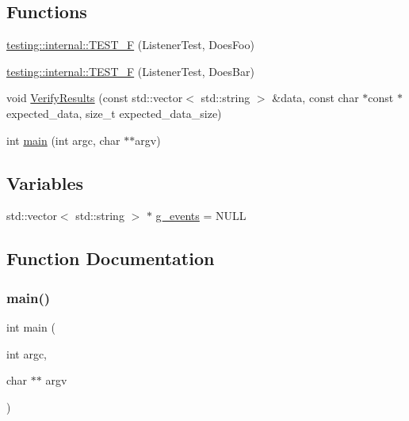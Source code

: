 \subsection*{Functions}
\begin{DoxyCompactItemize}
\item 
\hyperlink{namespacetesting_1_1internal_a7e113e9c70d45d89fe1703e58ff083b9}{testing\+::internal\+::\+T\+E\+S\+T\+\_\+F} (Listener\+Test, Does\+Foo)
\item 
\hyperlink{namespacetesting_1_1internal_a02cef32090020d164460dd3d9f8e2852}{testing\+::internal\+::\+T\+E\+S\+T\+\_\+F} (Listener\+Test, Does\+Bar)
\item 
void \hyperlink{gtest-listener__test_8cc_ab9d583cd17d35925ad3d12f864d57fe9}{Verify\+Results} (const std\+::vector$<$ std\+::string $>$ \&data, const char $\ast$const $\ast$expected\+\_\+data, size\+\_\+t expected\+\_\+data\+\_\+size)
\item 
int \hyperlink{gtest-listener__test_8cc_a3c04138a5bfe5d72780bb7e82a18e627}{main} (int argc, char $\ast$$\ast$argv)
\end{DoxyCompactItemize}
\subsection*{Variables}
\begin{DoxyCompactItemize}
\item 
std\+::vector$<$ std\+::string $>$ $\ast$ \hyperlink{gtest-listener__test_8cc_a32a264046f3603db11e6fcdaea5fb094}{g\+\_\+events} = N\+U\+LL
\end{DoxyCompactItemize}


\subsection{Function Documentation}
\mbox{\label{gtest-listener__test_8cc_a3c04138a5bfe5d72780bb7e82a18e627}} 
\subsubsection{\texorpdfstring{main()}{main()}}
{\footnotesize\ttfamily int main (\begin{DoxyParamCaption}\item[{int}]{argc,  }\item[{char $\ast$$\ast$}]{argv }\end{DoxyParamCaption})}

